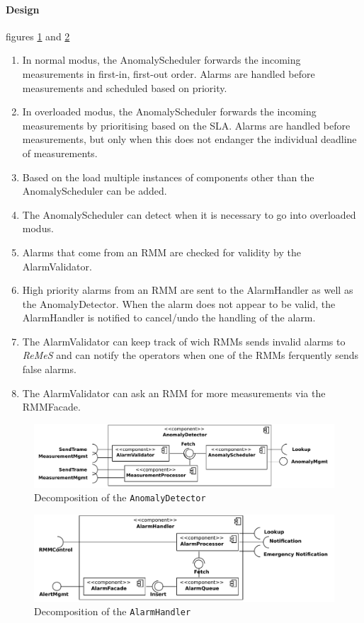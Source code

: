 \documentclass[a4paper,10pt]{article}
\newcommand{\rem}{\emph{ReMeS}\xspace}
\begin{document}
\paragraph{Design} figures \ref{fig:dec_anomaly} and \ref{fig:dec_alarmhandler}

\begin{enumerate}
    \item In normal modus, the AnomalyScheduler forwards the incoming measurements in first-in, first-out order. Alarms are handled before measurements and scheduled based on priority.
    \item In overloaded modus, the AnomalyScheduler forwards the incoming measurements by prioritising based on the SLA. Alarms are handled before measurements, but only when this does not endanger the individual deadline of measurements.
    \item Based on the load multiple instances of components other than the AnomalyScheduler can be added.
    \item The AnomalyScheduler can detect when it is necessary to go into overloaded modus.
    \item Alarms that come from an RMM are checked for validity by the AlarmValidator.
    \item High priority alarms from an RMM are sent to the AlarmHandler as well as the AnomalyDetector. When the alarm does not appear to be valid, the AlarmHandler is notified to cancel/undo the handling of the alarm.
    \item The AlarmValidator can keep track of wich RMMs sends invalid alarms to \rem and can notify the operators when one of the RMMs ferquently sends false alarms.
   	\item The AlarmValidator can ask an RMM for more measurements via the RMMFacade.
\end{enumerate}

\begin{figure}[!htp]
    \centering
    \includegraphics[width=\textwidth]{Decomposition_ AnomalyDetector}
    \caption{Decomposition of the \texttt{AnomalyDetector}}\label{fig:dec_anomaly}
\end{figure}

\begin{figure}[!htp]
    \centering
    \includegraphics[width=\textwidth]{Decomposition_ AlarmHandler component}
    \caption{Decomposition of the \texttt{AlarmHandler}}\label{fig:dec_alarmhandler}
\end{figure}
\end{document}
